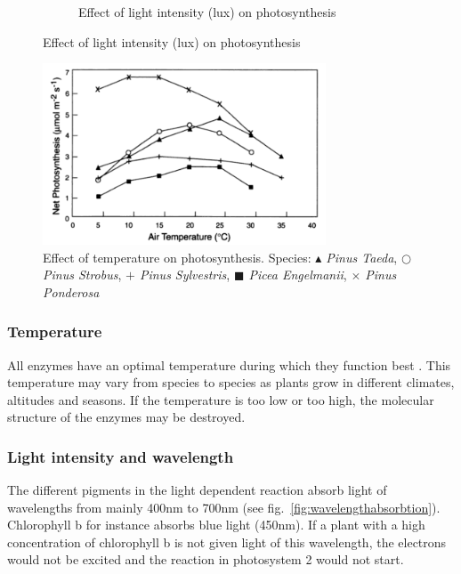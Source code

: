 \begin{figure}
\begin{subfigure}[b]{0.45\textwidth}
                \caption{Effect of light intensity (lux) on photosynthesis}
                \label{fig:lightintensity}
        \end{subfigure}
       
\end{figure}

\begin{figure}
\centering
\includegraphics[width=0.75\textwidth]{img/photosynthesis/temperature_new.png}
\caption{Effect of temperature on photosynthesis. Species:
 \textit{\ensuremath{\blacktriangle} Pinus Taeda},  
\textit{\ensuremath{\bigcirc} Pinus Strobus}, 
\textit{\ensuremath{+} Pinus Sylvestris}, 
\textit{\ensuremath{\blacksquare} Picea Engelmanii}, 
\textit{\ensuremath{\times} Pinus Ponderosa}
\citep{hollinger1995external}
}
\label{fig:temperature}
\end{figure}

\subsubsection{Temperature}
All enzymes have an optimal temperature during which they function best \citep{bios}. This temperature may vary from species to species as plants grow in different climates, altitudes and seasons. If the temperature is too low or too high, the molecular structure of the enzymes may be destroyed.

\subsubsection{Light intensity and wavelength}
The different pigments in the light dependent reaction absorb light of wavelengths from mainly 400nm to 700nm (see fig.~\ref{fig:wavelengthabsorbtion}). Chlorophyll b for instance absorbs blue light (450nm). If a plant with a high concentration of chlorophyll b is not given light of this wavelength, the electrons would not be excited and the reaction in photosystem 2 would not start.

